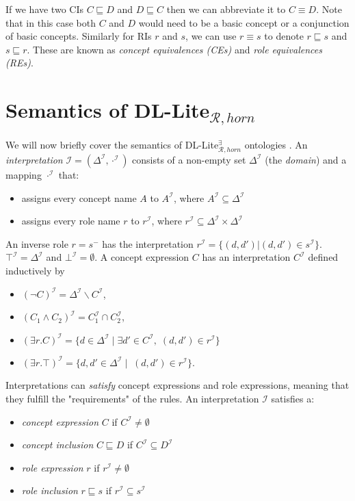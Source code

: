 If we have two CIs $C\sqsubseteq D$ and $D \sqsubseteq C$ then we can abbreviate it to $C \equiv D$. Note that in this case both $C$ and $D$ would need to be a basic concept or a conjunction of basic concepts. Similarly for RIs $r$ and $s$, we can use $r\equiv s$ to denote $r\sqsubseteq s$ and $s \sqsubseteq r$. These are known as \emph{concept equivalences (CEs)} and \emph{role equivalences (REs)}.

\section{Semantics of DL-Lite$_{\mathcal{R}, horn}$}
We will now briefly cover the semantics of DL-Lite$_{\mathcal{R}, horn}^{\exists}$ ontologies \cite{baader_horrocks_lutz_sattler_2017}. An \emph{interpretation} $\mathcal{I} = (\Delta^{\mathcal{I}}, \cdot^{\mathcal{I}})$ consists of a non-empty set $\Delta^{\mathcal{I}}$ (the \emph{domain}) and a mapping $\cdot^{\mathcal{I}}$ that:
\begin{itemize}
    \item assigns every concept name $A$ to $A^{\mathcal{I}}$, where $A^{\mathcal{I}}\subseteq \Delta^{\mathcal{I}}$
    \item assigns every role name $r$ to  $r^{\mathcal{I}}$, where $r^{\mathcal{I}}\subseteq \Delta^{\mathcal{I}}\times \Delta^{\mathcal{I}}$
\end{itemize}
An inverse role $r = s^-$ has the interpretation $r^{\mathcal{I}}=\{(d, d') | (d,d')\in s^{\mathcal{I}}\}$. $ \top^{\mathcal{I}} = \Delta^{\mathcal{I}} $ and $ \bot^{\mathcal{I}} = \emptyset $. A concept expression $C$ has an interpretation $C^{\mathcal{I}}$ defined inductively by
\begin{itemize}
    \item $(\neg C)^{\mathcal{I}} = \Delta^{\mathcal{I}} \backslash C^{\mathcal{I}} $,
    \item $ (C_{1} \wedge C_{2})^{\mathcal{I}} = C_{1}^{\mathcal{I}} \cap C_{2}^{\mathcal{I}} $,
    \item $ (\exists r.C)^{\mathcal{I}} = \{d\in \Delta ^{\mathcal{I}}\;|\; \exists d' \in C^{\mathcal{I}}, \; (d,d')\in r^{\mathcal{I}}\} $
    \item $ (\exists r.\top)^{\mathcal{I}} = \{d, d'\in \Delta ^{\mathcal{I}}\;|\; \; (d,d')\in r^{\mathcal{I}}\} $.
\end{itemize}

Interpretations can \emph{satisfy} concept expressions and role expressions, meaning that they fulfill the "requirements" of the rules. An interpretation $\mathcal{I}$ satisfies a:
\begin{itemize}
    \item \emph{concept expression} $C$ if $C^{\mathcal{I}} \neq \emptyset$
    \item \emph{concept inclusion} $C \sqsubseteq D$ if $C^{\mathcal{I}} \subseteq D^{\mathcal{I}}$
    \item \emph{role expression} $r$ if $r^{\mathcal{I}} \neq \emptyset$
    \item \emph{role inclusion } $r \sqsubseteq s$ if $r^{\mathcal{I}}  \subseteq s^{\mathcal{I}}$
\end{itemize} 

